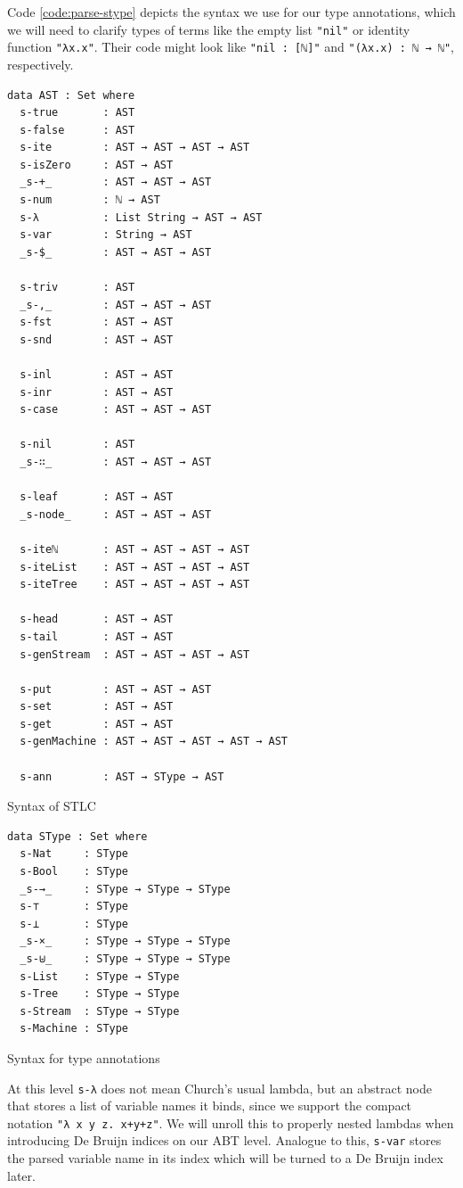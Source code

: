 Code \ref{code:parse-stype} depicts the syntax we use for our type annotations, which we will need to clarify types of terms like the empty list \verb$"nil"$ or identity function \verb$"λx.x"$. Their code might look like \verb$"nil : [ℕ]"$ and \verb$"(λx.x) : ℕ → ℕ"$, respectively.

\begin{listing}[H]
\begin{verbatim}
data AST : Set where
  s-true       : AST
  s-false      : AST
  s-ite        : AST → AST → AST → AST
  s-isZero     : AST → AST
  _s-+_        : AST → AST → AST
  s-num        : ℕ → AST
  s-λ          : List String → AST → AST
  s-var        : String → AST
  _s-$_        : AST → AST → AST

  s-triv       : AST
  _s-,_        : AST → AST → AST
  s-fst        : AST → AST
  s-snd        : AST → AST

  s-inl        : AST → AST
  s-inr        : AST → AST
  s-case       : AST → AST → AST

  s-nil        : AST
  _s-∷_        : AST → AST → AST

  s-leaf       : AST → AST
  _s-node_     : AST → AST → AST

  s-iteℕ       : AST → AST → AST → AST
  s-iteList    : AST → AST → AST → AST
  s-iteTree    : AST → AST → AST → AST

  s-head       : AST → AST
  s-tail       : AST → AST
  s-genStream  : AST → AST → AST → AST

  s-put        : AST → AST → AST
  s-set        : AST → AST
  s-get        : AST → AST
  s-genMachine : AST → AST → AST → AST → AST

  s-ann        : AST → SType → AST
\end{verbatim}
\caption{Syntax of STLC}
\label{code:parse-ast}
\end{listing}

\begin{listing}[H]
\begin{verbatim}
data SType : Set where
  s-Nat     : SType
  s-Bool    : SType
  _s-→_     : SType → SType → SType
  s-⊤       : SType
  s-⊥       : SType
  _s-×_     : SType → SType → SType
  _s-⊎_     : SType → SType → SType
  s-List    : SType → SType
  s-Tree    : SType → SType
  s-Stream  : SType → SType
  s-Machine : SType
\end{verbatim}
\caption{Syntax for type annotations}
\label{code:parse-stype}
\end{listing}

At this level \verb$s-λ$ does not mean Church's usual lambda, but an abstract node that stores a list of variable names it binds, since we support the compact notation \verb$"λ x y z. x+y+z"$. We will unroll this to properly nested lambdas when introducing De Bruijn indices \cite{de1972lambda} on our ABT level. Analogue to this, \verb$s-var$ stores the parsed variable name in its index which will be turned to a De Bruijn index later.

